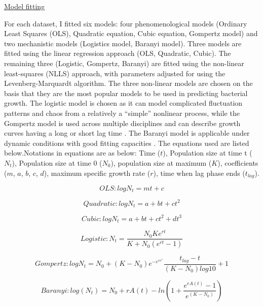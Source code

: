 \documentclass[11pt]{article}
\begin{document}
\underline{Model fitting} 

For each dataset, I fitted six models: four phenomenological models (Ordinary Least Squares (OLS), Quadratic equation, Cubic equation, Gompertz model) and two mechanistic models (Logistics model, Baranyi model). Three models are fitted using the linear regression approach (OLS, Quadratic, Cubic). The remaining three (Logistic, Gompertz, Baranyi) are fitted using the non-linear least-squares (NLLS) approach, with parameters adjusted for using the Levenberg-Marquardt algorithm. The three non-linear models are chosen on the basis that they are the most popular models to be used in predicting bacterial growth. The logistic model is chosen as it can model complicated fluctuation patterns and chaos from a relatively a “simple” nonlinear process, while the Gompertz model is used across multiple disciplines and can describe growth curves having a long or short lag time \cite{zwietering_modeling_1990}. The Baranyi model is applicable under dynamic conditions with good fitting capacities \cite{poschet_analysis_2005}. The equations used are listed below.Notations in equations are as below: Time (\(t\)), Population size at time t (\(N_{t}\)), Population size at time 0 (\(N_{0}\)), population size at maximum (\(K\)), coefficients (\(m\), \(a\), \(b\), \(c\), \(d\)), maximum specific growth rate (\(r\)), time when lag phase ends (\(t_{lag}\)).


\begin{equation} 
  OLS: log N_{t} = mt + c 
\end{equation}

\begin{equation}
  Quadratic: log N_{t} = a + bt + ct^{2} 
\end{equation}

\begin{equation}
  Cubic: log N_{t} = a + bt + ct^{2} + dt^{3} 
\end{equation}

\begin{equation}
  Logistic: N_{t} = \frac{N_{0}Ke^{rt}} {K + N_{0}(e^{rt}-1)} 
\end{equation}

\begin{equation} 
  Gompertz: logN_{t} = N_{0} + (K - N_{0})e^{-e^{re^{1}}} \frac{t_{lag} - t}{(K - N_{0})log{10}}+1 
\end{equation}

\begin{equation} 
  Baranyi: log(N_{t}) = N_{0}+rA(t) -ln(1 + \frac{e^{rA(t)}-1}{e^{(K - N_{0})}}) 
\end{equation}
\end{document}
